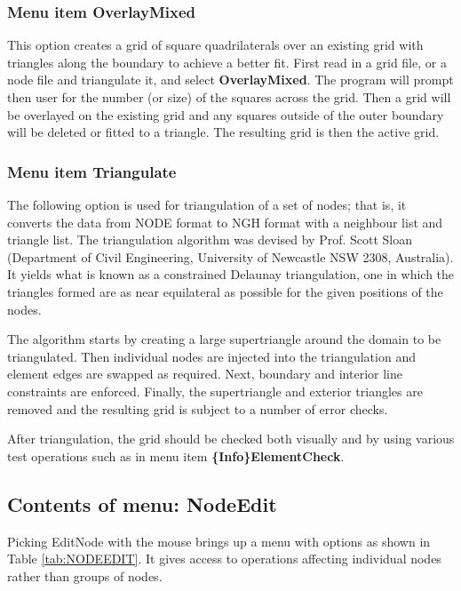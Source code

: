 \documentclass{article}
\begin{document}
\subsubsection[Menu item OverlayMixed]{Menu item OverlayMixed}
This option creates a grid of square quadrilaterals over an existing grid with triangles along the boundary to achieve a better fit. First read in a grid file, or a node file and triangulate it, and select {\bf OverlayMixed}. The program will prompt then user for the number (or size) of the squares across the grid. Then a grid will be overlayed on the existing grid and any squares outside of the outer boundary will be deleted or fitted to a triangle. The resulting grid is then the active grid.

\subsubsection[Menu item Triangulate]{Menu item Triangulate}

The following option is used for triangulation of a set of nodes; that is, it converts the data from NODE format to NGH format with a neighbour list and triangle list. The triangulation algorithm was devised by Prof. Scott Sloan (Department of Civil Engineering, University of Newcastle NSW 2308, Australia). It yields what is known as a constrained Delaunay triangulation, one in which the triangles formed are as near equilateral as possible for the given positions of the nodes.

The algorithm starts by creating a large supertriangle around the domain to be triangulated. Then individual nodes are injected into the triangulation and element edges are swapped as required. Next, boundary and interior line constraints are enforced. Finally, the supertriangle and exterior triangles are removed and the resulting grid is subject to a number of error checks.

After triangulation, the grid should be checked both visually and by using various test operations such as in menu item {\bf \{Info\}ElementCheck}.

\subsection{Contents of menu: NodeEdit}
Picking EditNode with the mouse brings up a menu with options as shown in Table \ref{tab:NODEEDIT}. It gives access to operations affecting individual nodes rather than groups of nodes. 
\end{document}
